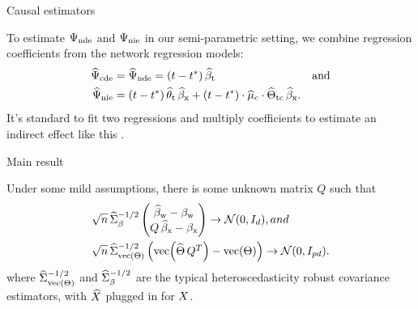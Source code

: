 \documentclass{beamer}
\theoremstyle{remark}
\begin{document}
\begin{frame}{Causal estimators}

    To estimate $\Psi_\mathrm{nde}$ and $\Psi_\mathrm{nie}$ in our semi-parametric setting, we combine regression coefficients from the network regression models:
    \begin{align*}
        \cdehat & = \ndehat = \paren*{t - t^*} \, \betathat                                                                              & \text{and} \\
        \niehat & = \paren*{t - t^*} \, \thetathat \, \betaxhat + \paren*{t - t^*} \cdot \widehat{\mu}_c \cdot \Thetatchat \, \betaxhat.
    \end{align*}
    It's standard to fit two regressions and multiply coefficients to estimate an indirect effect like this \citep{vanderweele_mediation_2014}.

\end{frame}

\begin{frame}{Main result}

    \begin{theorem}

        \vspace{2mm}

        Under some mild assumptions, there is some unknown matrix $Q$ such that
        \begin{equation*}
            \begin{aligned}
                \sqrt{ n } \,
                 & \Sigmahatbeta^{-1/2}
                \begin{pmatrix}
                    \betawhat - \betaw \\
                    Q \, \betaxhat - \betax
                \end{pmatrix}
                \to
                \Normal{0}{I_d}, and     \\
                \sqrt{ n } \,
                 & \Sigmahattheta^{-1/2}
                \begin{pmatrix}
                    \vecc \paren*{\Thetahat \, Q^T} - \Thetavec
                \end{pmatrix}
                \to
                \Normal{0}{I_{p d}}.
            \end{aligned}
        \end{equation*}
        \noindent where $\widehat{\Sigma}_{\operatorname*{vec} \left(\Theta\right)}^{-1/2}$ and $\widehat{\Sigma}_\beta^{-1/2}$ are the typical heteroscedasticity robust covariance estimators, with $\widehat{X}$ plugged in for $X$.
    \end{theorem}
\end{frame}
\end{document}
